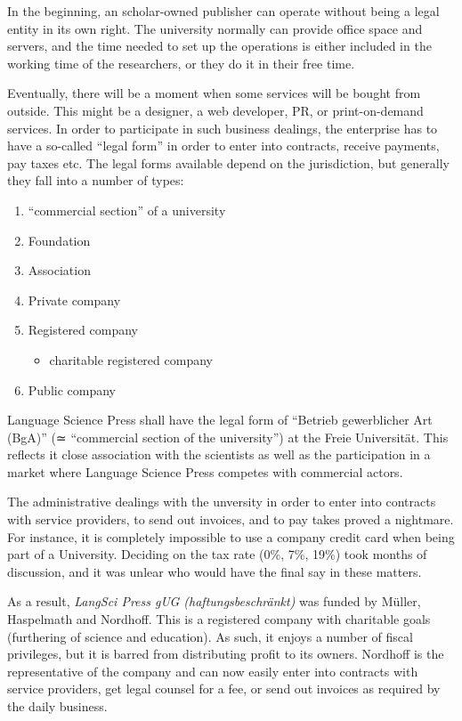 \documentclass[output=guidelines,nonflat,
draftmode
]{langsci/langscibook}
\newcommand{\background}[1]{ 
  \vspace{5mm}
  \renewcommand{\tblslinecolour}{lsDarkBlue}
  \tblssy[red]{explore2}{Background}{#1}
}
\newcommand{\langscisolution}[1]{
  \renewcommand{\tblslinecolour}{lsLightBlue}
  \tblssy{langsci}{LangSci solution}{#1}
}
\newcommand{\evaluation}[1]{
  \renewcommand{\tblslinecolour}{lsLightOrange}
  \tblssy{receipt}{Evaluation}{#1}
}
\renewcommand{\tblssy}[4][black!12]{%
  \renewcommand{\langscisymbol}{#2}\renewcommand{\tblsboxcolor}{#1}
  \begin{mdframed}[style=yellowexercise,frametitle={#3}]
    #4
  \end{mdframed}
}
\begin{document}
\background{In the beginning, an scholar-owned publisher can operate without being a legal entity in its own right. The university normally can provide office space and servers, and the time needed to set up the operations is either included in the working time of the researchers, or they do it in their free time. 

Eventually, there will be a moment when some services will be bought from outside. This might be a designer, a web developer, PR, or print-on-demand services. In order to participate in such business dealings, the enterprise has to have a so-called ``legal form'' in order to enter into contracts, receive payments, pay taxes etc. The legal forms available depend on the jurisdiction, but generally they fall into a number of types:

\begin{enumerate}
 \item ``commercial section'' of a university
 \item Foundation 
 \item Association 
 \item Private company
 \item Registered company 
 \begin{itemize}
  \item charitable registered company
 \end{itemize}
 \item Public company 
\end{enumerate} 
}
\langscisolution{
Language Science Press shall have the legal form of ``Betrieb gewerblicher Art (BgA)'' (≃ ``commercial section of the university'') at the Freie Universität.
This reflects it close association with the scientists as well as the participation in a market where Language Science Press competes with commercial actors. 
}
\evaluation{
The administrative dealings with the unversity in order to enter into contracts with service providers, to send out invoices, and to pay takes proved a nightmare. For instance, it is completely impossible to use a company credit card when being part of a University. Deciding on the tax rate (0\%, 7\%, 19\%) took months of discussion, and it was unlear who would have the final say in these matters. 

As a result, \textit{LangSci Press gUG (haftungsbeschränkt)} was funded by Müller, Haspelmath and Nordhoff. This is a registered company with charitable goals (furthering of science and education). As such, it enjoys a number of fiscal privileges, but it is barred from  distributing profit to its owners. Nordhoff is the representative of the company and can now easily enter into contracts with service providers, get legal counsel for a fee, or send out invoices as required by the daily business. 
}
\end{document}
